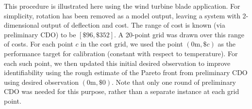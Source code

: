 \documentclass[12pt]{article}
\begin{document}
This procedure is illustrated here using the wind turbine blade application.
%
For simplicity, rotation has been removed as a model output, leaving a system with 2-dimensional output of deflection and cost. 
%
The range of cost is known (via preliminary CDO) to be $[\$96,\$352]$.
%
A 20-point grid was drawn over this range of costs. 
%
%
For each point $c$ in the cost grid, we used the point $(0\mathrm m,\$c)$ as the performance target for calibration (constant with respect to temperature).
%
For each such point, we then updated this initial desired observation to improve identifiability using the rough estimate of the Pareto front from preliminary CDO using desired observation $(0\mathrm m,\$0)$.
%
Note that only one round of preliminary CDO was needed for this purpose, rather than a separate instance at each grid point.
%
%
%
\end{document}
